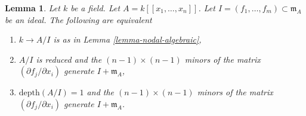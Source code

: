 \documentclass{stacks-project}
\theoremstyle{plain}
\newtheorem{lemma}[subsection]{Lemma}
\theoremstyle{definition}
\theoremstyle{remark}
\numberwithin{equation}{subsection}
\begin{document}
\begin{lemma}
\label{lemma-fitting-ideal}
Let $k$ be a field. Let $A = k[[x_1, \ldots, x_n]]$. Let
$I = (f_1, \ldots, f_m) \subset \mathfrak m_A$ be an ideal. The following
are equivalent
\begin{enumerate}
\item $k \to A/I$ is as in Lemma \ref{lemma-nodal-algebraic},
\item $A/I$ is reduced and the
$(n - 1) \times (n - 1)$ minors of the matrix
$(\partial f_j/\partial x_i)$ generate $I + \mathfrak m_A$,
\item $\text{depth}(A/I) = 1$ and the
$(n - 1) \times (n - 1)$ minors of the matrix
$(\partial f_j/\partial x_i)$ generate $I + \mathfrak m_A$.
\end{enumerate}
\end{lemma}
\end{document}
